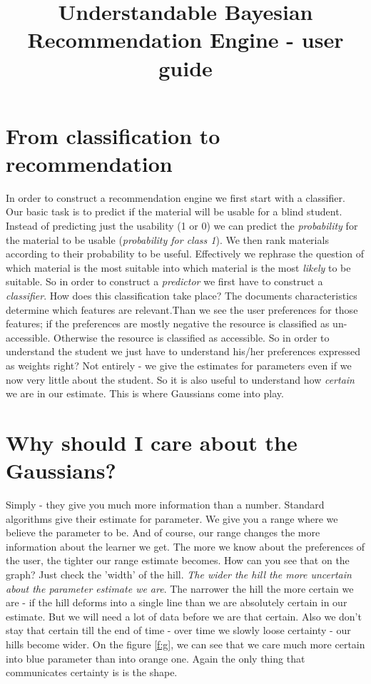 \documentclass{article}
\title{Understandable Bayesian Recommendation Engine - user guide}
\begin{document}
\maketitle

 

\section{From classification to recommendation}
In order to construct a recommendation engine we first start with a classifier. Our basic task is to predict if the material will be usable for a blind student. Instead of predicting just the usability (1 or 0) we can predict the \emph{probability} for the material to be usable (\emph{probability for class 1}). We then rank materials according to their probability to be useful. Effectively we rephrase the question of which material is the most suitable into which material is the most \emph{likely} to be suitable. 
\bigbreak
So in order to construct a \emph{predictor} we first have to construct a \emph{classifier}. How does this classification take place? The documents characteristics determine which features are relevant.Than we see the user preferences for those features; if the preferences are mostly negative the resource is classified as un-accessible. Otherwise the resource is classified as accessible.
\bigbreak
So in order to understand the student we just have to understand his/her preferences expressed as weights right? Not entirely - we give the estimates for parameters even if we now very little about the student. So it is also useful to understand how \emph{certain} we are in our estimate. This is where Gaussians come into play.


\section{Why should I care about the Gaussians?}
Simply - they give you much more information than a number. Standard algorithms give their estimate for parameter. We give you a range where we believe the parameter to be. And of course, our range changes the more information about the learner we get. 
\bigbreak
The more we know about the preferences of the user, the tighter our range estimate becomes. How can you see that on the graph? Just check the 'width' of the hill. \emph{The wider the hill the more uncertain about the parameter estimate we are}. The narrower the hill the more certain we are - if the hill deforms into a single line than we are absolutely certain in our estimate. But we will need a lot of data before we are that certain. Also we don't stay that certain till the end of time - over time we slowly loose certainty - our hills become wider. On the figure \ref{f:g}, we can see that we care much more certain into blue parameter than into orange one. Again the only thing that communicates certainty is is the shape. 
 
\end{document}
